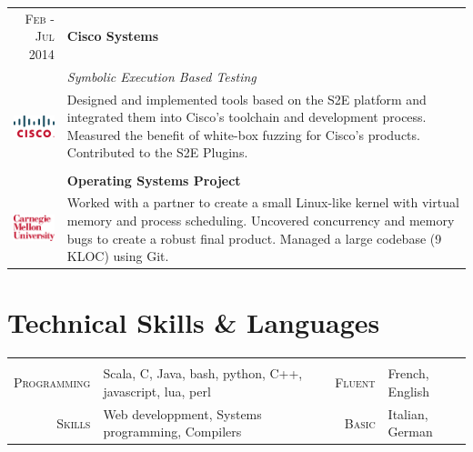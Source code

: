 \documentclass[a4paper,11pt]{article} %
\begin{document}
\begin{tabularx}{\textwidth}{r|X}

\textsc{Feb - Jul 2014} & \textbf{Cisco Systems} \\
\multirow{4}{*}{ \includegraphics[width=60pt]{img/cisco.eps}}
& \emph{Symbolic Execution Based Testing}\\ 
& \footnotesize{Designed and implemented tools based on the S2E platform and
integrated them into Cisco's toolchain and development process. Measured the
benefit of white-box fuzzing for Cisco's products. Contributed to the S2E
Plugins.}\\
\multicolumn{2}{c}{} \\


\textsc{Jan - May 2013} & \textbf{Operating Systems Project}\\
\multirow{3}{*}{ \includegraphics[width=55pt]{img/cmu.eps}}
& \footnotesize{Worked with a partner to create a small Linux-like kernel
with virtual memory and process scheduling. Uncovered concurrency and memory
bugs to create a robust final product. Managed a large codebase (9 KLOC) using Git.}\\


\end{tabularx}


\section{Technical Skills \& Languages}
\begin{center}

\vspace{-0.3cm}
\begin{tabularx}{\textwidth}{rX|rl}

& & & \\
\textsc{\large{Programming}} & Scala, C, Java, bash, python, C++, javascript,
lua, perl &
\textsc{\large{Fluent}} & French, English \\
\textsc{\large{Skills}} & Web developpment, Systems programming, Compilers &
\textsc{\large{Basic}} & Italian, German \\

\end{tabularx}

\end{center}
\end{document}
